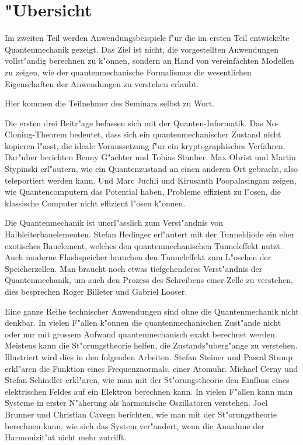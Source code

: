 \chapter*{"Ubersicht}
\rhead{}
Im zweiten Teil werden Anwendungsbeispiele f"ur die im ersten
Teil entwickelte Quantenmechanik gezeigt.
Das Ziel ist nicht, die vorgestellten Anwendungen vollst"andig
berechnen zu k"onnen, sondern an Hand von vereinfachten Modellen
zu zeigen, wie der quantenmechanische Formalismus die wesentlichen
Eigenschaften der Anwendungen zu verstehen erlaubt.

Hier kommen die Teilnehmer des Seminars selbst zu Wort.

Die ersten drei Beitr"age befassen sich mit der Quanten-Informatik.
Das No-Cloning-Theorem bedeutet, dass sich ein quantenmechanischer
Zustand nicht kopieren l"asst, die ideale Voraussetzung f"ur ein
kryptographisches Verfahren.
Dar"uber berichten Benny G"achter und Tobias Stauber.
Max Obrist und Martin Stypinski erl"autern, wie ein Quantenzustand
an einen anderen Ort gebracht, also teleportiert werden kann.
Und Marc Juchli und Kirusanth Poopalasingam zeigen, wie Quantencomputern
das Potential haben, Probleme effizient zu l"osen, die klassische 
Computer nicht effizient l"osen k"onnen.

Die Quantenmechanik ist unerl"asslich zum Verst"andnis von
Halbleiterbauelementen.
Stefan Hedinger erl"autert mit der Tunneldiode
ein eher exotisches Bauelement, welches den quantenmechanischen
Tunneleffekt nutzt.
Auch moderne Flashspeicher brauchen den Tunneleffekt zum L"oschen 
der Speicherzellen.
Man braucht noch etwas tiefgehenderes Verst"andnis der Quantenmechanik,
um auch den Prozess des Schreibens einer Zelle zu verstehen, dies
besprechen Roger Billeter und Gabriel Looser.

Eine ganze Reihe technischer Anwendungen sind ohne die Quantenmechanik
nicht denkbar.
In vielen F"allen k"onnen die quantenmechanischen Zust"ande nicht oder nur
mit grossem Aufwand quantenmechanisch exakt berechnet werden.
Meistens kann die St"orungstheorie helfen, die Zustands"uberg"ange
zu verstehen.
Illustriert wird dies in den folgenden Arbeiten.
Stefan Steiner und Pascal Stump erkl"aren die Funktion eines
Frequenznormals, einer Atomuhr. 
Michael Cerny und Stefan Schindler erkl"aren, wie man mit der
St"orungstheorie den Einfluss eines elektrischen Feldes auf ein
Elektron berechnen kann.
In vielen F"allen kann man Systeme in erster N"aherung als harmonische
Oszillatoren verstehen. Joel Brunner und Christian Cavegn berichten,
wie man mit der St"orungstheorie berechnen kann, wie sich das System
ver"andert, wenn die Annahme der Harmonizit"at nicht mehr zutrifft.

